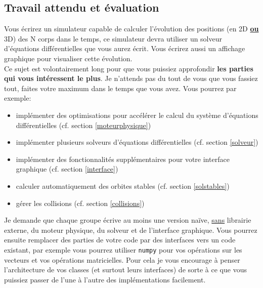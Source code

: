 \documentclass{article}
\begin{document}
\subsection{Travail attendu et évaluation}

Vous écrirez un simulateur capable de calculer l'évolution des positions (en 2D \textbf{\underline{ou}} 3D) des N corps dans le temps, ce simulateur devra utiliser un solveur d'équations différentielles que vous aurez écrit. Vous écrirez aussi un affichage graphique pour visualiser cette évolution. \\
Ce sujet est volontairement long pour que vous puissiez approfondir \textbf{les parties qui vous intéressent le plus}. Je n'attends pas du tout de vous que vous fassiez tout, faites votre maximum dans le temps que vous avez. Vous pourrez par exemple:
\begin{itemize}
    \item implémenter des optimisations pour accélérer le calcul du système d'équations différentielles (cf. section \ref{moteurphysique})
    \item implémenter plusieurs solveurs d'équations différentielles (cf. section \ref{solveur})
    \item implémenter des fonctionnalités supplémentaires pour votre interface graphique (cf. section \ref{interface})
    \item calculer automatiquement des orbites stables (cf. section \ref{solstables})
    \item gérer les collisions (cf. section \ref{collisions})
\end{itemize}
Je demande que chaque groupe écrive au moins une version naïve, \underline{sans} librairie externe, du moteur physique, du solveur et de l'interface graphique. Vous pourrez ensuite remplacer des parties de votre code par des interfaces vers un code existant, par exemple vous pourrez utiliser \verb!numpy! pour vos opérations sur les vecteurs et vos opérations matricielles. Pour cela je vous encourage à penser l'architecture de vos classes (et surtout leurs interfaces) de sorte à ce que vous puissiez passer de l'une à l'autre des implémentations facilement.\\

\vspace{1em}
\end{document}
